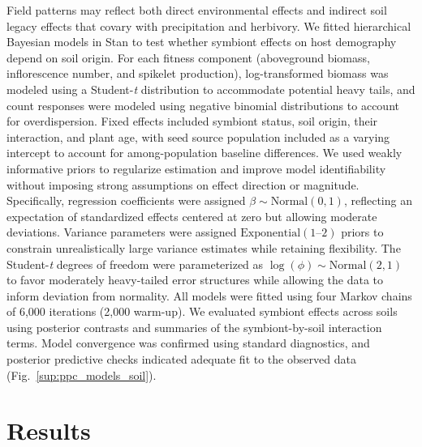 \documentclass[12pt]{article}\usepackage[]{graphicx}\usepackage[dvipsnames]{xcolor}
\begin{document}
Field patterns may reflect both direct environmental effects and indirect soil legacy effects that covary with precipitation and herbivory.  
We fitted hierarchical Bayesian models in Stan to test whether symbiont effects on host demography depend on soil origin.  
For each fitness component (aboveground biomass, inflorescence number, and spikelet production), log-transformed biomass was modeled using a Student-\emph{t} distribution to accommodate potential heavy tails, and count responses were modeled using negative binomial distributions to account for overdispersion.  
Fixed effects included symbiont status, soil origin, their interaction, and plant age, with seed source population included as a varying intercept to account for among-population baseline differences.  
We used weakly informative priors to regularize estimation and improve model identifiability without imposing strong assumptions on effect direction or magnitude. Specifically, regression coefficients were assigned $\beta \sim \mathrm{Normal}(0,1)$, reflecting an expectation of standardized effects centered at zero but allowing moderate deviations. Variance parameters were assigned $\mathrm{Exponential}(1\text{--}2)$ priors to constrain unrealistically large variance estimates while retaining flexibility. The Student-\emph{t} degrees of freedom were parameterized as $\log(\phi) \sim \mathrm{Normal}(2,1)$ to favor moderately heavy-tailed error structures while allowing the data to inform deviation from normality.
All models were fitted using four Markov chains of 6,000 iterations (2,000 warm-up). We evaluated symbiont effects across soils using posterior contrasts and summaries of the symbiont-by-soil interaction terms. Model convergence was confirmed using standard diagnostics, and posterior predictive checks indicated adequate fit to the observed data (Fig.~\ref{sup:ppc_models_soil}).


\section*{Results}
\end{document}
